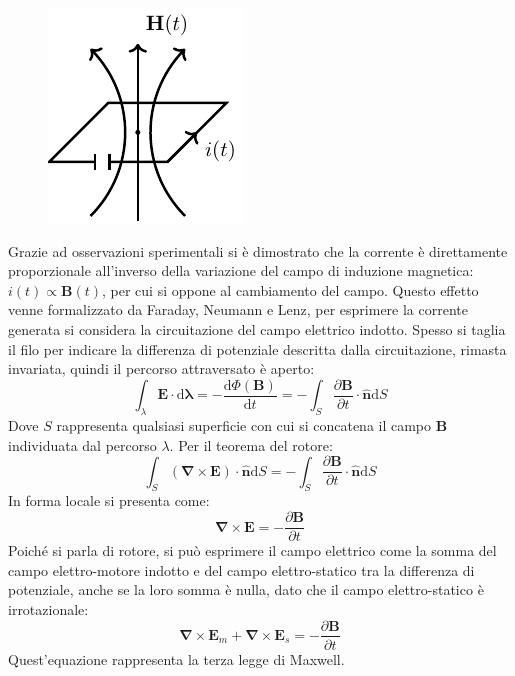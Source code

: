 \documentclass{article}
\newcommand{\vect}[1]{\boldsymbol{\mathbf{#1}}}
\newcommand{\df}{\mathrm{d}}
\numberwithin{equation}{subsection}
\begin{document}
\begin{figure}[H]%
    \centering
    \includegraphics{terza-legge-maxwell.pdf}%
    \label{fig:terza-legge-maxwell}
\end{figure}

Grazie ad osservazioni sperimentali si è dimostrato che la corrente è direttamente proporzionale all'inverso della variazione del campo di induzione magnetica: 
$i(t)\propto\vect{B}(t)$, per cui si oppone al cambiamento del campo. Questo effetto venne formalizzato da Faraday, Neumann e Lenz, per esprimere la corrente generata 
si considera la circuitazione del campo elettrico indotto. Spesso si taglia il filo per indicare la differenza di potenziale descritta dalla circuitazione, rimasta invariata, 
quindi il percorso attraversato è aperto: 
\begin{equation*}
    \displaystyle\int_{\lambda}\vect{E}\cdot \df\vect{\lambda}=-\frac{\df\Phi(\vect{B})}{\df t}=-\int_S\frac{\partial \vect{B}}{\partial t}\cdot\hat{\vect{n}}\df S
\end{equation*}
Dove $S$ rappresenta qualsiasi superficie con cui si concatena il campo $\vect{B}$ individuata dal percorso $\lambda$. Per il teorema del rotore:
\begin{equation}
    \displaystyle\int_S(\vect\nabla\times\vect{E})\cdot\hat{\vect{n}}\df S=-\int_S\frac{\partial \vect{B}}{\partial t}\cdot\hat{\vect{n}}\df S
\end{equation}
In forma locale si presenta come:
\begin{equation*}
    \vect\nabla\times\vect{E}=\displaystyle-\frac{\partial \vect{B}}{\partial t}
\end{equation*}
Poiché si parla di rotore, si può esprimere il campo elettrico come la somma del campo elettro-motore indotto e del campo elettro-statico tra la differenza di potenziale, 
anche se la loro somma è nulla, dato che il campo elettro-statico è irrotazionale:
\begin{equation}
    \vect\nabla\times\vect{E}_m+\vect\nabla\times\vect{E}_s=-\displaystyle\frac{\partial \vect{B}}{\partial t}
\end{equation} 
Quest'equazione rappresenta la terza legge di Maxwell. 
\end{document}
